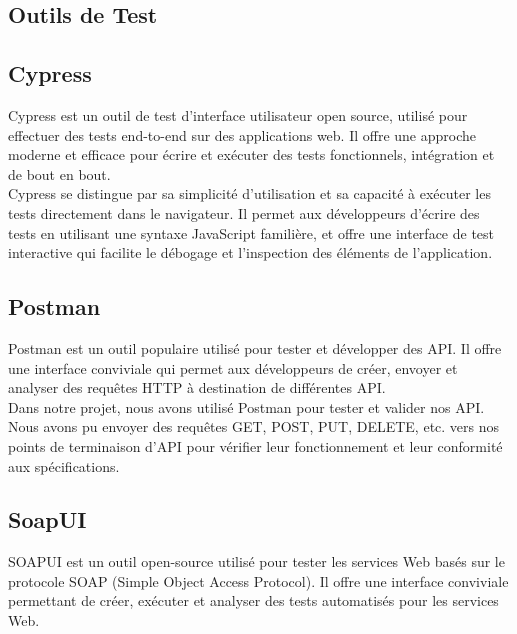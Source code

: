 \subsection{Outils de Test}
\subsection*{Cypress}
Cypress est un outil de test d'interface utilisateur open source, utilisé pour effectuer des tests end-to-end sur des applications web. Il offre une approche moderne et efficace pour écrire et exécuter des tests fonctionnels, intégration et de bout en bout.\\

Cypress se distingue par sa simplicité d'utilisation et sa capacité à exécuter les tests directement dans le navigateur. Il permet aux développeurs d'écrire des tests en utilisant une syntaxe JavaScript familière, et offre une interface de test interactive qui facilite le débogage et l'inspection des éléments de l'application.

\subsection*{Postman}
Postman est un outil populaire utilisé pour tester et développer des API. Il offre une interface conviviale qui permet aux développeurs de créer, envoyer et analyser des requêtes HTTP à destination de différentes API.\\

Dans notre projet, nous avons utilisé Postman pour tester et valider nos API. Nous avons pu envoyer des requêtes GET, POST, PUT, DELETE, etc. vers nos points de terminaison d'API pour vérifier leur fonctionnement et leur conformité aux spécifications.

\subsection*{SoapUI}
SOAPUI est un outil open-source utilisé pour tester les services Web basés sur le protocole SOAP (Simple Object Access Protocol). Il offre une interface conviviale permettant de créer, exécuter et analyser des tests automatisés pour les services Web.\\


